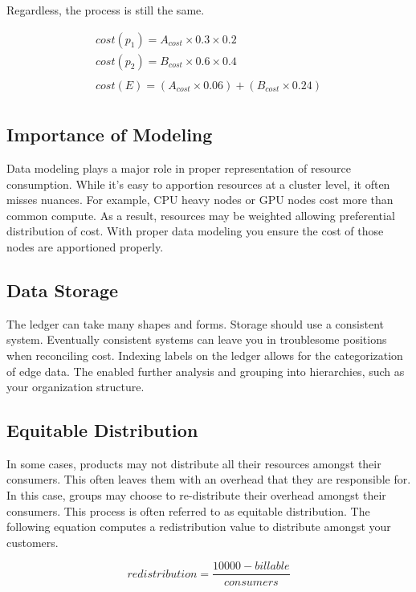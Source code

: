 \documentclass[10pt, a4paper, twocolumn]{article}
\begin{document}
    Regardless, the process is still the same.

    \begin{gather*}
      cost(p_{1}) = A_{cost} \times 0.3 \times 0.2 \\
      cost(p_{2}) = B_{cost} \times 0.6 \times 0.4 \\
      \\
      cost(E) = (A_{cost} \times 0.06) + (B_{cost} \times 0.24) \\
    \end{gather*}

  \subsection*{Importance of Modeling}
    Data modeling plays a major role in proper representation of resource consumption.
    While it's easy to apportion resources at a cluster level, it often misses nuances.
    For example, CPU heavy nodes or GPU nodes cost more than common compute.
    As a result, resources may be weighted allowing preferential distribution of cost.
    With proper data modeling you ensure the cost of those nodes are apportioned properly.

  \subsection*{Data Storage}
    The ledger can take many shapes and forms.
    Storage should use a consistent system.
    Eventually consistent systems can leave you in troublesome positions when reconciling cost.
    Indexing labels on the ledger allows for the categorization of edge data.
    The enabled further analysis and grouping into hierarchies, such as your organization structure.

  \subsection*{Equitable Distribution}
    In some cases, products may not distribute all their resources amongst their consumers.
    This often leaves them with an overhead that they are responsible for.
    In this case, groups may choose to re-distribute their overhead amongst their consumers.
    This process is often referred to as equitable distribution.
    The following equation computes a redistribution value to distribute amongst your customers.

    \[ redistribution = \frac{10000 - billable}{consumers} \]

\printbibliography
\end{document}
